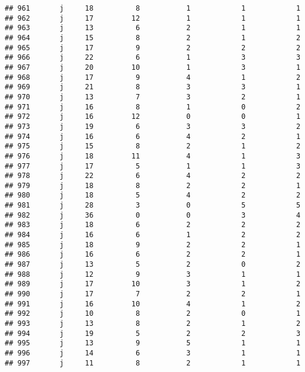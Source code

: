 \documentclass[
]{article}
\begin{document}
\begin{verbatim}
## 961       j     18          8           1            1            1
## 962       j     17         12           1            1            1
## 963       j     13          6           2            1            1
## 964       j     15          8           2            1            2
## 965       j     17          9           2            2            2
## 966       j     22          6           1            3            3
## 967       j     20         10           1            3            1
## 968       j     17          9           4            1            2
## 969       j     21          8           3            3            1
## 970       j     13          7           3            2            1
## 971       j     16          8           1            0            2
## 972       j     16         12           0            0            1
## 973       j     19          6           3            3            2
## 974       j     16          6           4            2            1
## 975       j     15          8           2            1            2
## 976       j     18         11           4            1            3
## 977       j     17          5           1            1            3
## 978       j     22          6           4            2            2
## 979       j     18          8           2            2            1
## 980       j     18          5           4            2            2
## 981       j     28          3           0            5            5
## 982       j     36          0           0            3            4
## 983       j     18          6           2            2            2
## 984       j     16          6           1            2            2
## 985       j     18          9           2            2            1
## 986       j     16          6           2            2            1
## 987       j     13          5           2            0            2
## 988       j     12          9           3            1            1
## 989       j     17         10           3            1            2
## 990       j     17          7           2            2            1
## 991       j     16         10           4            1            2
## 992       j     10          8           2            0            1
## 993       j     13          8           2            1            2
## 994       j     19          5           2            2            3
## 995       j     13          9           5            1            1
## 996       j     14          6           3            1            1
## 997       j     11          8           2            1            1

\end{verbatim}
\end{document}
